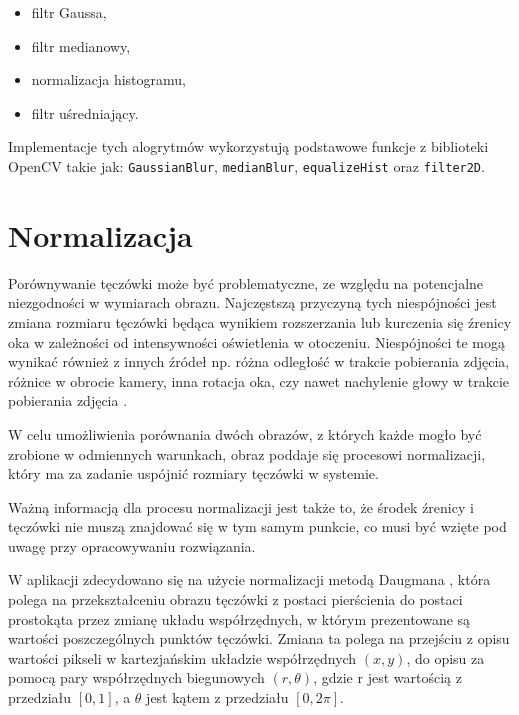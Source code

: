 \begin{itemize}
  \item filtr Gaussa,
  \item filtr medianowy,
  \item normalizacja histogramu,
  \item filtr uśredniający.
\end{itemize}

Implementacje tych alogrytmów wykorzystują podstawowe funkcje z biblioteki OpenCV takie jak:
\verb|GaussianBlur|, \verb|medianBlur|, \verb|equalizeHist| oraz \verb|filter2D|.

\section{Normalizacja}

Porównywanie tęczówki może by\'c problematyczne, ze względu na potencjalne niezgodności w
wymiarach obrazu. Najczęstszą przyczyną tych niespójności jest zmiana rozmiaru tęczówki
będąca wynikiem rozszerzania lub kurczenia się  \'zrenicy oka w zależności od intensywności
oświetlenia w otoczeniu. Niespójności te mogą wynika\'c również z innych \'zródeł np. różna
odległoś\'c w trakcie pobierania zdjęcia, różnice w obrocie kamery, inna rotacja oka, czy
nawet nachylenie głowy w trakcie pobierania zdjęcia \cite{DaugmanHowIrisRecognitionWorks}.\newline

W celu umożliwienia porównania dwóch obrazów, z których każde mogło by\'c zrobione w odmiennych
warunkach, obraz poddaje się procesowi normalizacji, który ma za zadanie uspójni\'c rozmiary
tęczówki w systemie.

\noindent
Ważną informacją dla procesu normalizacji jest także to, że środek \'zrenicy i tęczówki nie
muszą znajdowa\'c się w tym samym punkcie, co musi by\'c wzięte pod uwagę przy opracowywaniu
rozwiązania.\newline

W aplikacji zdecydowano się na użycie normalizacji metodą Daugmana \cite{DaugmanHowIrisRecognitionWorks}, która polega na przekształceniu
obrazu tęczówki z postaci pierścienia do postaci prostokąta przez zmianę układu współrzędnych, w którym
prezentowane są wartości poszczególnych punktów tęczówki. Zmiana ta polega na przejściu z opisu
wartości pikseli w kartezjańskim układzie współrzędnych $(x,y)$, do opisu za pomocą pary
współrzędnych biegunowych $(r, \theta)$, gdzie r jest wartością z przedziału $[0,1]$, a $\theta$ jest kątem
z przedziału $[0, 2\pi]$.\newline

